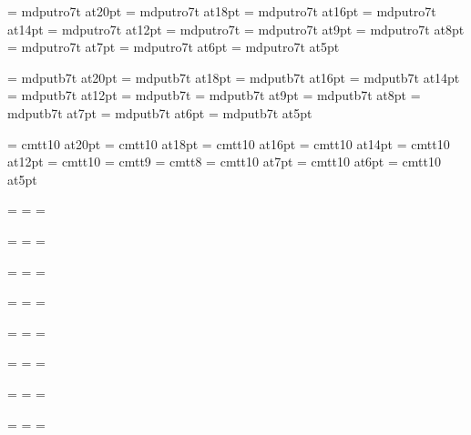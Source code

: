 \font\twentysl=     mdputro7t at20pt
\font\eighteensl=   mdputro7t at18pt
\font\sixteensl=    mdputro7t at16pt
\font\fourteensl=   mdputro7t at14pt
\font\twelvesl=     mdputro7t at12pt
\font\tensl=        mdputro7t
\font\ninesl=       mdputro7t at9pt
\font\eightsl=      mdputro7t at8pt
\font\sevensl=      mdputro7t at7pt
\font\sixsl=        mdputro7t at6pt
\font\fivesl=       mdputro7t at5pt

\font\twentybf=     mdputb7t at20pt
\font\eighteenbf=   mdputb7t at18pt
\font\sixteenbf=    mdputb7t at16pt
\font\fourteenbf=   mdputb7t at14pt
\font\twelvebf=     mdputb7t at12pt
\font\tenbf=        mdputb7t
\font\ninebf=       mdputb7t at9pt
\font\eightbf=      mdputb7t at8pt
\font\sevenbf=      mdputb7t at7pt
\font\sixbf=        mdputb7t at6pt
\font\fivebf=       mdputb7t at5pt

\font\twentytt=     cmtt10 at20pt
\font\eighteentt=   cmtt10 at18pt
\font\sixteentt=    cmtt10 at16pt
\font\fourteentt=   cmtt10 at14pt
\font\twelvett=     cmtt10 at12pt
\font\tentt=        cmtt10
\font\ninett=       cmtt9
\font\eighttt=      cmtt8
\font\seventt=      cmtt10 at7pt
\font\sixtt=        cmtt10 at6pt
\font\fivett=       cmtt10 at5pt




=\tenrm
{}=\sevenrm
{}=\fiverm
\def\rm{\fam=0 \tenrm}

=\teni
{}=\seveni
{}=\fivei
\def\mit{\fam=1}

=\tensy
{}=\sevensy
{}=\fivesy
\def\cal{\fam=2}

=\tenex
{}=\sevenex
{}=\fiveex


\def\it{\fam=\itfam \tenit}
\textfont\itfam=\tenit
\scriptfont\itfam=\sevenit
\scriptscriptfont\itfam=\fiveit

\def\sl{\fam=\slfam \tensl}
\textfont\slfam=\tensl
\scriptfont\slfam=\sevensl
\scriptscriptfont\slfam=\fivesl

\def\bf{\fam=\bffam \tenbf}
\textfont\bffam=\tenbf
\scriptfont\bffam=\sevenbf
\scriptscriptfont\bffam=\fivebf

\def\tt{\fam=\ttfam \tentt}
\textfont\ttfam=\tentt
\scriptfont\ttfam=\seventt
\scriptscriptfont\ttfam=\fivett

